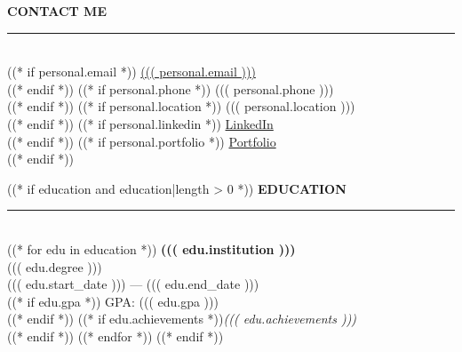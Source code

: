 \documentclass[11pt,a4paper]{article}
\begin{document}
\begin{minipage}[t]{0.35\textwidth}
\color{body}
\vspace{7mm}
\hspace{5mm}
\begin{minipage}[t]{0.82\textwidth}

\vspace{2mm}

{\fontsize{9}{11}\selectfont\bfseries\color{banner}\MakeUppercase{Contact Me}}\\[2pt]
{\color{divider}\rule{\linewidth}{0.6pt}}\\[8pt]
((* if personal.email *))
{\fontsize{8}{10}\selectfont\faEnvelope\hspace{8pt}\href{mailto:((( personal.email )))}{((( personal.email ))) }}\\[10pt]
((* endif *))
((* if personal.phone *))
{\fontsize{8}{10}\selectfont\faPhone\hspace{8pt}((( personal.phone )))}\\[10pt]
((* endif *))
((* if personal.location *))
{\fontsize{8}{10}\selectfont\faMapMarker*\hspace{8pt}((( personal.location )))}\\[10pt]
((* endif *))
((* if personal.linkedin *))
{\fontsize{8}{10}\selectfont\faLinkedin\hspace{8pt}\href{((* if 'http' not in personal.linkedin *))https://((* endif *))((( personal.linkedin )))}{LinkedIn}}\\[10pt]
((* endif *))
((* if personal.portfolio *))
{\fontsize{8}{10}\selectfont\faGlobe\hspace{8pt}\href{((* if 'http' not in personal.portfolio *))https://((* endif *))((( personal.portfolio )))}{Portfolio}}\\[10pt]
((* endif *))

\vspace{10pt}

((* if education and education|length > 0 *))
{\fontsize{9}{11}\selectfont\bfseries\color{banner}\MakeUppercase{Education}}\\[2pt]
{\color{divider}\rule{\linewidth}{0.6pt}}\\[8pt]
((* for edu in education *))
{\fontsize{8.5}{10.5}\selectfont\bfseries ((( edu.institution )))}\\[2pt]
{\fontsize{8}{10}\selectfont ((( edu.degree )))}\\[2pt]
{\scriptsize\color{muted} ((( edu.start_date ))) --- ((( edu.end_date )))}\\
((* if edu.gpa *)){\scriptsize\color{muted} GPA: ((( edu.gpa )))}\\((* endif *))
((* if edu.achievements *)){\scriptsize\textit{((( edu.achievements )))}}\\((* endif *))
\vspace{7pt}
((* endfor *))
\vspace{5pt}
((* endif *))


\end{minipage}
\end{minipage}
\end{document}
